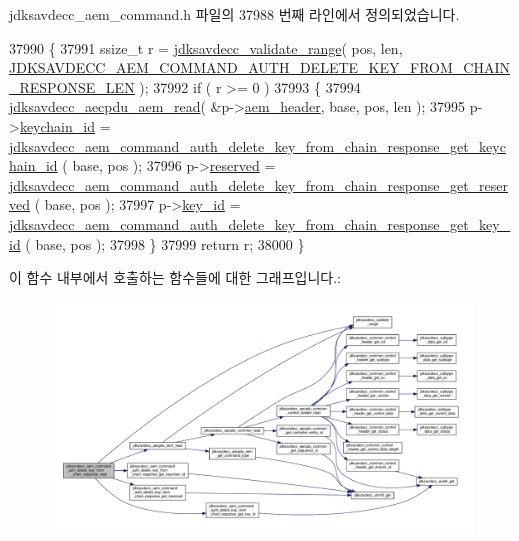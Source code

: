 jdksavdecc\+\_\+aem\+\_\+command.\+h 파일의 37988 번째 라인에서 정의되었습니다.


\begin{DoxyCode}
37990 \{
37991     ssize\_t r = \hyperlink{group__util_ga9c02bdfe76c69163647c3196db7a73a1}{jdksavdecc\_validate\_range}( pos, len, 
      \hyperlink{group__command__auth__delete__key__from__chain__response_ga318d8a52d9e3502557122ceced9277fd}{JDKSAVDECC\_AEM\_COMMAND\_AUTH\_DELETE\_KEY\_FROM\_CHAIN\_RESPONSE\_LEN}
       );
37992     \textcolor{keywordflow}{if} ( r >= 0 )
37993     \{
37994         \hyperlink{group__aecpdu__aem_gae2421015dcdce745b4f03832e12b4fb6}{jdksavdecc\_aecpdu\_aem\_read}( &p->\hyperlink{structjdksavdecc__aem__command__auth__delete__key__from__chain__response_ae1e77ccb75ff5021ad923221eab38294}{aem\_header}, base, pos, len );
37995         p->\hyperlink{structjdksavdecc__aem__command__auth__delete__key__from__chain__response_a10ed6547e01665c453e2a40b142f7526}{keychain\_id} = 
      \hyperlink{group__command__auth__delete__key__from__chain__response_gab222b1bc3f4d03164c7c4fd666247167}{jdksavdecc\_aem\_command\_auth\_delete\_key\_from\_chain\_response\_get\_keychain\_id}
      ( base, pos );
37996         p->\hyperlink{structjdksavdecc__aem__command__auth__delete__key__from__chain__response_a5a6ed8c04a3db86066924b1a1bf4dad3}{reserved} = 
      \hyperlink{group__command__auth__delete__key__from__chain__response_gaea8769f4843c3e00098b74a54618717c}{jdksavdecc\_aem\_command\_auth\_delete\_key\_from\_chain\_response\_get\_reserved}
      ( base, pos );
37997         p->\hyperlink{structjdksavdecc__aem__command__auth__delete__key__from__chain__response_a37cbdf6056556ccfaee3ab01dc7c3032}{key\_id} = 
      \hyperlink{group__command__auth__delete__key__from__chain__response_ga096de062c9d18253301a80a27a3f78a2}{jdksavdecc\_aem\_command\_auth\_delete\_key\_from\_chain\_response\_get\_key\_id}
      ( base, pos );
37998     \}
37999     \textcolor{keywordflow}{return} r;
38000 \}
\end{DoxyCode}


이 함수 내부에서 호출하는 함수들에 대한 그래프입니다.\+:
\nopagebreak
\begin{figure}[H]
\begin{center}
\leavevmode
\includegraphics[width=350pt]{group__command__auth__delete__key__from__chain__response_ga6891c40b7387cc6e19f8c4f4656d8aa5_cgraph}
\end{center}
\end{figure}


